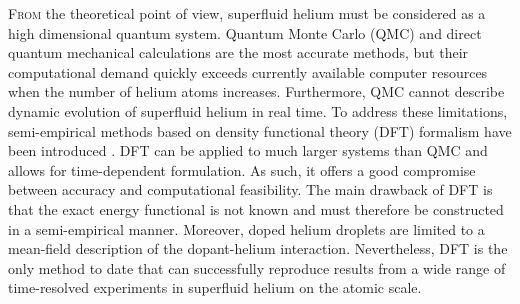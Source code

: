 \documentclass[12pt,a4paper,twosides]{book}
\begin{document}
	\lettrine[lines=3,findent=3pt,nindent=0pt]{F}{rom} the theoretical point of view, superfluid helium must be considered as a high dimensional quantum system. Quantum Monte Carlo (QMC) \cite{Kro02} and direct quantum mechanical \cite{deL06,deL10,Agu13} calculations are the most accurate methods, but their computational demand quickly exceeds currently available computer resources when the number of helium atoms increases. Furthermore, QMC cannot describe dynamic evolution of superfluid helium in real time. To address these limitations, semi-empirical methods based on  density functional theory (DFT) formalism have been introduced \cite{Str87a,Str87b,Dal95}. DFT can be applied to much larger systems than QMC and allows for time-dependent formulation. As such, it offers a good compromise between accuracy and computational feasibility. The main drawback of DFT is that the exact energy functional is not known and must therefore be constructed in a semi-empirical manner. Moreover, doped helium droplets are limited to a mean-field description of the dopant-helium interaction. Nevertheless, DFT is the only method to date that can successfully reproduce results from a wide range of time-resolved experiments in superfluid helium on the atomic scale.\\
		
\end{document}
